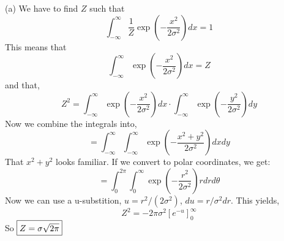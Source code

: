 \documentclass[12pt,letterpaper,fleqn]{hmcpset}
\begin{document}
\begin{solution}
	(a) We have to find $Z$ such that
	$$\int_{-\infty}^{\infty}\frac{1}{Z}\exp\left(-\frac{x^2}{2\sigma^2}\right)dx = 1$$
	This means that
	$$\int_{-\infty}^{\infty}\exp\left(-\frac{x^2}{2\sigma^2}\right)dx = Z$$
	and that, 
	$$ Z^2 = \int_{-\infty}^{\infty}\exp\left(-\frac{x^2}{2\sigma^2}\right)dx \cdot \int_{-\infty}^{\infty}\exp\left(-\frac{y^2}{2\sigma^2}\right)dy $$
	Now we combine the integrals into,
	$$ = \int_{-\infty}^{\infty}\int_{-\infty}^{\infty}\exp\left(-\frac{x^2+y^2}{2\sigma^2}\right)dxdy $$
	That $x^2 + y^2$ looks familiar. If we convert to polar coordinates, we get:
	$$ = \int_{0}^{2\pi}\int_{0}^{\infty}\exp\left(-\frac{r^2}{2\sigma^2}\right)rdrd\theta $$
	Now we can use a u-substition, $u=r^2/(2\sigma^2)$, $du = r/\sigma^2dr$. This yields,
	$$Z^2 = -2\pi \sigma^2 \left[ e^{-u} \right]_0^\infty$$
	So $\fbox{$Z=\sigma\sqrt{2\pi}$}$\\


\end{solution}
\end{document}
